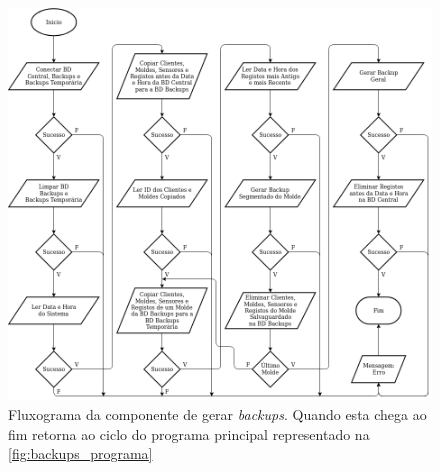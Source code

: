 \documentclass[11pt,twoside,a4paper]{report}
\begin{document}
\begin{figure}[H]
	\begin{center}
		\includegraphics[width=1\textwidth]{fluxograma_backups_gerar01} %
		\caption[Fluxograma da componente de gerar \textit{backups}]{Fluxograma da componente de gerar \textit{backups}. Quando esta chega ao fim retorna ao ciclo do programa principal representado na \autoref{fig:backups_programa}}
		\label{fig:backups_gerar}
	\end{center}
\end{figure}
\end{document}
